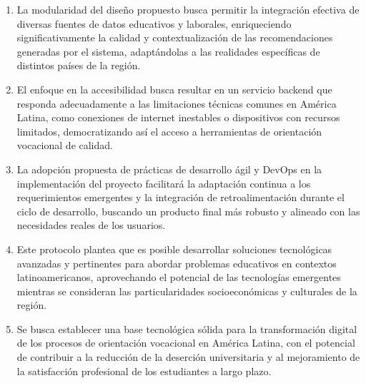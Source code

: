 \begin{enumerate}
  \item La modularidad del diseño propuesto busca permitir la integración efectiva de diversas fuentes de datos educativos y laborales, enriqueciendo significativamente la calidad y contextualización de las recomendaciones generadas por el sistema, adaptándolas a las realidades específicas de distintos países de la región.
  
  \item El enfoque en la accesibilidad busca resultar en un servicio backend que responda adecuadamente a las limitaciones técnicas comunes en América Latina, como conexiones de internet inestables o dispositivos con recursos limitados, democratizando así el acceso a herramientas de orientación vocacional de calidad.
  
  \item La adopción propuesta de prácticas de desarrollo ágil y DevOps en la implementación del proyecto facilitará la adaptación continua a los requerimientos emergentes y la integración de retroalimentación durante el ciclo de desarrollo, buscando un producto final más robusto y alineado con las necesidades reales de los usuarios.
  
  \item Este protocolo plantea que es posible desarrollar soluciones tecnológicas avanzadas y pertinentes para abordar problemas educativos en contextos latinoamericanos, aprovechando el potencial de las tecnologías emergentes mientras se consideran las particularidades socioeconómicas y culturales de la región.
  
  \item Se busca establecer una base tecnológica sólida para la transformación digital de los procesos de orientación vocacional en América Latina, con el potencial de contribuir a la reducción de la deserción universitaria y al mejoramiento de la satisfacción profesional de los estudiantes a largo plazo.
  
\end{enumerate}